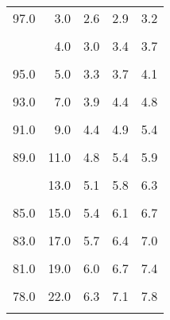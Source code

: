 \documentclass[
]{book}
\begin{document}
\begin{longtable}[t]{rrrrr}
97.0 & 3.0 & 2.6 & 2.9 & 3.2\\
\cellcolor{gray!6}{96.5} & \cellcolor{gray!6}{3.5} & \cellcolor{gray!6}{2.8} & \cellcolor{gray!6}{3.1} & \cellcolor{gray!6}{3.4}\\
\addlinespace
96.0 & 4.0 & 3.0 & 3.4 & 3.7\\
\cellcolor{gray!6}{95.5} & \cellcolor{gray!6}{4.5} & \cellcolor{gray!6}{3.2} & \cellcolor{gray!6}{3.5} & \cellcolor{gray!6}{3.9}\\
95.0 & 5.0 & 3.3 & 3.7 & 4.1\\
\cellcolor{gray!6}{94.0} & \cellcolor{gray!6}{6.0} & \cellcolor{gray!6}{3.6} & \cellcolor{gray!6}{4.1} & \cellcolor{gray!6}{4.5}\\
93.0 & 7.0 & 3.9 & 4.4 & 4.8\\
\addlinespace
\cellcolor{gray!6}{92.0} & \cellcolor{gray!6}{8.0} & \cellcolor{gray!6}{4.1} & \cellcolor{gray!6}{4.6} & \cellcolor{gray!6}{5.1}\\
91.0 & 9.0 & 4.4 & 4.9 & 5.4\\
\cellcolor{gray!6}{90.0} & \cellcolor{gray!6}{10.0} & \cellcolor{gray!6}{4.6} & \cellcolor{gray!6}{5.1} & \cellcolor{gray!6}{5.6}\\
89.0 & 11.0 & 4.8 & 5.4 & 5.9\\
\cellcolor{gray!6}{88.0} & \cellcolor{gray!6}{12.0} & \cellcolor{gray!6}{5.0} & \cellcolor{gray!6}{5.6} & \cellcolor{gray!6}{6.1}\\
\addlinespace
87.0 & 13.0 & 5.1 & 5.8 & 6.3\\
\cellcolor{gray!6}{86.0} & \cellcolor{gray!6}{14.0} & \cellcolor{gray!6}{5.3} & \cellcolor{gray!6}{5.9} & \cellcolor{gray!6}{6.5}\\
85.0 & 15.0 & 5.4 & 6.1 & 6.7\\
\cellcolor{gray!6}{84.0} & \cellcolor{gray!6}{16.0} & \cellcolor{gray!6}{5.6} & \cellcolor{gray!6}{6.3} & \cellcolor{gray!6}{6.9}\\
83.0 & 17.0 & 5.7 & 6.4 & 7.0\\
\addlinespace
\cellcolor{gray!6}{82.0} & \cellcolor{gray!6}{18.0} & \cellcolor{gray!6}{5.9} & \cellcolor{gray!6}{6.6} & \cellcolor{gray!6}{7.2}\\
81.0 & 19.0 & 6.0 & 6.7 & 7.4\\
\cellcolor{gray!6}{80.0} & \cellcolor{gray!6}{20.0} & \cellcolor{gray!6}{6.1} & \cellcolor{gray!6}{6.8} & \cellcolor{gray!6}{7.5}\\
78.0 & 22.0 & 6.3 & 7.1 & 7.8\\
\cellcolor{gray!6}{76.0} & \cellcolor{gray!6}{24.0} & \cellcolor{gray!6}{6.5} & \cellcolor{gray!6}{7.3} & \cellcolor{gray!6}{8.0}\\

\end{longtable}
\end{document}
